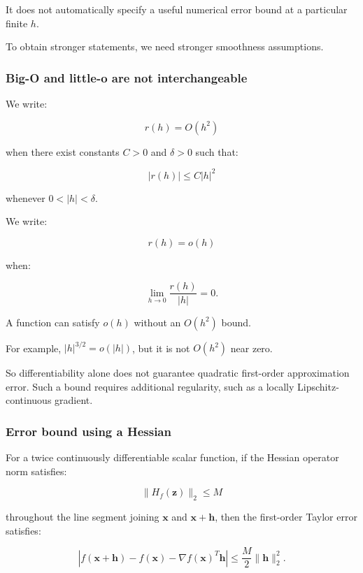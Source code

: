 It does not automatically specify a useful numerical error bound at a particular finite \(h\).

To obtain stronger statements, we need stronger smoothness assumptions.

\subsubsection{Big-O and little-o are not interchangeable}\label{02-foundations-ii-ch021-big-o-and-little-o-are-not-interchangeable}

\hypertarget{02-foundations-ii-ch021-big-o-and-little-o-are-not-interchangeable}{}

We write:

\[
r(h)=O(h^2)
\]

when there exist constants \(C>0\) and \(\delta>0\) such that:

\[
|r(h)|\le C|h|^2
\]

whenever \(0<|h|<\delta\).

We write:

\[
r(h)=o(h)
\]

when:

\[
\lim_{h\to0}\frac{r(h)}{|h|}=0.
\]

A function can satisfy \(o(h)\) without an \(O(h^2)\) bound.

For example, \(|h|^{3/2}=o(|h|)\), but it is not \(O(h^2)\) near zero.

So differentiability alone does not guarantee quadratic first-order approximation error. Such a bound requires additional regularity, such as a locally Lipschitz-continuous gradient.

\subsubsection{Error bound using a Hessian}\label{02-foundations-ii-ch021-error-bound-using-a-hessian}

\hypertarget{02-foundations-ii-ch021-error-bound-using-a-hessian}{}

For a twice continuously differentiable scalar function, if the Hessian operator norm satisfies:

\[
\|H_f(\mathbf z)\|_2\le M
\]

throughout the line segment joining \(\mathbf x\) and \(\mathbf x+\mathbf h\), then the first-order Taylor error satisfies:

\[
\boxed{ \left| f(\mathbf x+\mathbf h) -f(\mathbf x) -\nabla f(\mathbf x)^T\mathbf h \right| \le \frac M2\|\mathbf h\|_2^2 }.
\]

